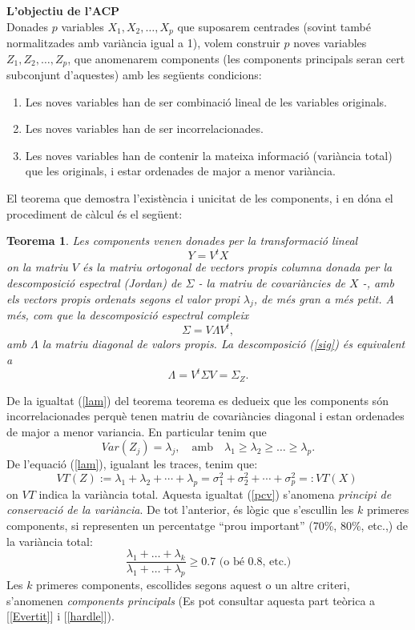 \documentclass[english]{article}
\newtheorem{theorem}{Teorema}
\begin{document}
\noindent\textbf{L'objectiu de l'ACP}\\
Donades $p$ variables $X_1,X_2, \ldots,X_p$ que suposarem centrades
(sovint també normalitzades amb variància igual a 1), volem
construir $p$ noves variables $Z_1,Z_2, \ldots,Z_p$, que anomenarem
components (les components principals seran cert subconjunt
d'aquestes) amb les següents condicions:
\begin{enumerate}
 \item Les noves variables han de ser combinació lineal de les
 variables originals.
 \item Les noves variables han de ser incorrelacionades.
 \item Les noves variables han de contenir la mateixa informació (variància
 total) que les originals, i estar ordenades de major a menor
 variància.
\end{enumerate}
El teorema que demostra l'existència i unicitat de les components, i
en dóna el procediment de càlcul és el següent:


\begin{theorem}
Les components  venen donades per la transformació lineal
$$Y =V^tX$$
on la matriu $V$ és la matriu ortogonal de vectors propis columna
donada per la descomposició espectral (Jordan) de $\Sigma$ - la
matriu de covariàncies de $X$ -, amb els vectors propis ordenats
segons el valor propi $\lambda_j$, de més gran a més petit. A més,
com que la descomposició espectral compleix
\begin{equation}
\Sigma=V\Lambda
V^t, \label{sig}
\end{equation}
amb $\Lambda$ la matriu diagonal de
valors propis. La descomposició (\ref{sig}) és equivalent a
\begin{equation}
\Lambda=V^t\Sigma V=\Sigma_Z.
\label{lam}
\end{equation}
\end{theorem}

De la igualtat (\ref{lam}) del teorema teorema es dedueix que les
components són incorrelacionades perquè tenen matriu de covariàncies
diagonal i estan ordenades de major a menor variancia. En particular
tenim que
$$Var (Z_j ) = \lambda_j,\quad\mbox{amb}\quad \lambda_1\geq\lambda_2\geq \ldots \geq \lambda_p.$$
De l'equació  (\ref{lam}), igualant les traces, tenim que:
\begin{equation}
 VT(Z):= \lambda_1+\lambda_2+\cdots + \lambda_p=\sigma_1^2 +\sigma_2^2+\cdots + \sigma_p^2=: VT(X)\ \label{pcv}
\end{equation}
on $VT$ indica la variància total. Aquesta igualtat (\ref{pcv})
s'anomena \emph{principi de conservació de la variància}.
\clearpage
De tot l'anterior, és lògic que s'escullin les $k$ primeres
components, si representen un percentatge ``prou important'' (70\%,
80\%, etc.,) de la variància total: $$
\frac{\lambda_1+\ldots+\lambda_k}{\lambda_1+\ldots+\lambda_p} \geq
0.7  \mbox{ (o bé 0.8, etc.)}
$$
Les $k$ primeres components, escollides segons aquest o un altre
criteri, s'anomenen \emph{components principals} (Es pot consultar aquesta part teòrica a [\ref{Evertit}] i [\ref{hardle}]).
\end{document}
